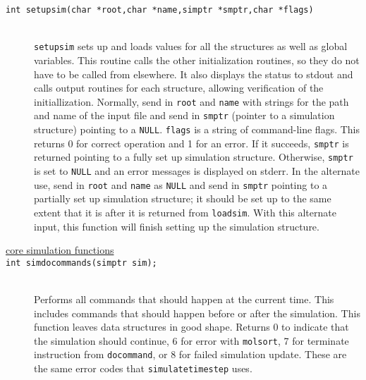 \documentclass {book}
\begin{document}
\begin{description}
\item[\texttt{int setupsim(char *root,char *name,simptr *smptr,char *flags)}]
\hfill \\
\texttt{setupsim} sets up and loads values for all the structures as well as global variables.  This routine calls the other initialization routines, so they do not have to be called from elsewhere.  It also displays the status to stdout and calls output routines for each structure, allowing verification of the initiallization.  Normally, send in \texttt{root} and \texttt{name} with strings for the path and name of the input file and send in \texttt{smptr} (pointer to a simulation structure) pointing to a \texttt{NULL}.  \texttt{flags} is a string of command-line flags.  This returns 0 for correct operation and 1 for an error.  If it succeeds, \texttt{smptr} is returned pointing to a fully set up simulation structure.  Otherwise, \texttt{smptr} is set to \texttt{NULL} and an error messages is displayed on stderr.  In the alternate use, send in \texttt{root} and \texttt{name} as \texttt{NULL} and send in \texttt{smptr} pointing to a partially set up simulation structure; it should be set up to the same extent that it is after it is returned from \texttt{loadsim}.  With this alternate input, this function will finish setting up the simulation structure.

\item[\underline{core simulation functions}]

\item[\texttt{int simdocommands(simptr sim);}]
\hfill \\
Performs all commands that should happen at the current time.  This includes commands that should happen before or after the simulation.  This function leaves data structures in good shape.  Returns 0 to indicate that the simulation should continue, 6 for error with \texttt{molsort}, 7 for terminate instruction from \texttt{docommand}, or  8 for failed simulation update.  These are the same error codes that \texttt{simulatetimestep} uses.


\end{description}
\end{document}
